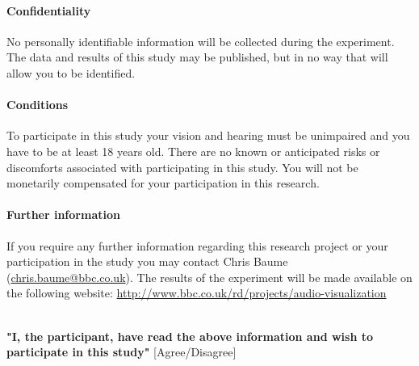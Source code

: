 \paragraph{Confidentiality}
No personally identifiable information will be collected during the experiment.
The data and results of this study may be published, but in no way that will
allow you to be identified.

\paragraph{Conditions}
To participate in this study your vision and hearing must be unimpaired and you
have to be at least 18 years old. There are no known or anticipated risks or
discomforts associated with participating in this study. You will not be
monetarily compensated for your participation in this research.

\paragraph{Further information}
If you require any further information regarding this research project or your
participation in the study you may contact Chris Baume
(\url{chris.baume@bbc.co.uk}).  The results of the experiment will be made
available on the following website:
\url{http://www.bbc.co.uk/rd/projects/audio-visualization}

\mbox{}\\
\noindent
\textbf{"I, the participant, have read the above information and wish to
  participate in this study"} [Agree/Disagree]
